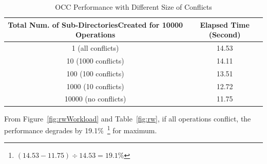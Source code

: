 \begin{table}[h]
	\centering
\begin{tabular}{|c|c|}
	\hline
	\textbf{Total Num. of Sub-DirectoriesCreated for 10000 Operations} & \textbf{Elapsed Time (Second)} \\ \hline
	1 (all conflicts)                                                  & 14.53                          \\ \hline
	10 (1000 conflicts)                                                & 14.11                          \\ \hline
	100 (100 conflicts)                                                & 13.51                          \\ \hline
	1000 (10 conflicts)                                                & 12.72                          \\ \hline
	10000 (no conflicts)                                               & 11.75                          \\ \hline
\end{tabular}
	\caption{OCC Performance with Different Size of Conflicts}
	\label{table:conflicts}
\end{table}

\noindent From Figure~\ref{fig:rwWorkload} and Table~\ref{fig:rw}, if all operations conflict, the performance degrades by 19.1\%~\footnote{$(14.53-11.75) \div 14.53 = 19.1$\%} for maximum.